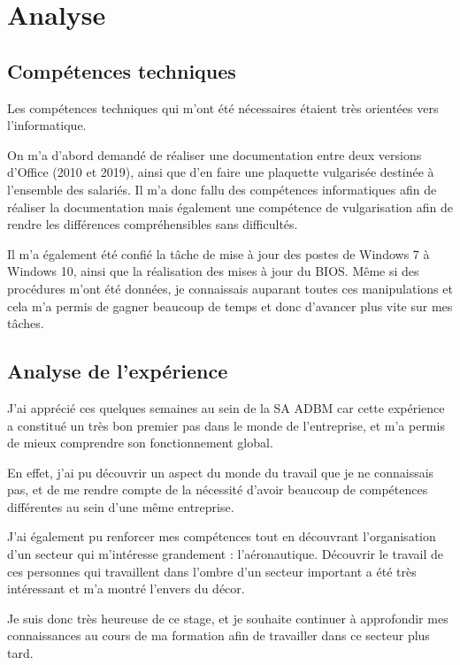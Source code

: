 \chapter{Analyse}


\section{Compétences techniques}

Les compétences techniques qui m'ont été nécessaires étaient très orientées vers l'informatique.

On m'a d'abord demandé de réaliser une documentation entre deux versions d'Office (2010 et 2019), ainsi que d'en faire une plaquette vulgarisée destinée à l'ensemble des salariés.
Il m'a donc fallu des compétences informatiques afin de réaliser la documentation mais également une compétence de vulgarisation afin de rendre les différences compréhensibles sans difficultés.

Il m'a également été confié la tâche de mise à jour des postes de Windows 7 à Windows 10, ainsi que la réalisation des mises à jour du BIOS.
Même si des procédures m'ont été données, je connaissais auparant toutes ces manipulations et cela m'a permis de gagner beaucoup de temps et donc d'avancer plus vite sur mes tâches.

\section{Analyse de l'expérience}

J'ai apprécié ces quelques semaines au sein de la SA ADBM car cette expérience a constitué un très bon premier pas dans le monde de l'entreprise, et m'a permis de mieux comprendre son fonctionnement global.

En effet, j'ai pu découvrir un aspect du monde du travail que je ne connaissais pas, et de me rendre compte de la nécessité d'avoir beaucoup de compétences différentes au sein d'une même entreprise.

J'ai également pu renforcer mes compétences tout en découvrant l'organisation d'un secteur qui m'intéresse grandement : l'aéronautique. Découvrir le travail de ces personnes qui travaillent dans l'ombre d'un secteur important a été très intéressant et m'a montré l'envers du décor.

Je suis donc très heureuse de ce stage, et je souhaite continuer à approfondir mes connaissances au cours de ma formation afin de travailler dans ce secteur plus tard.


